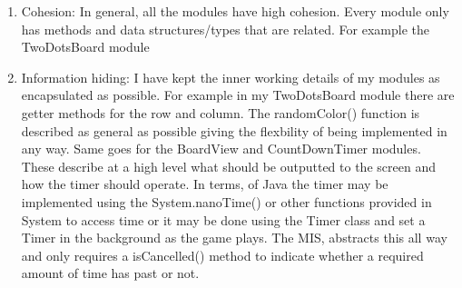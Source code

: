 \documentclass[12pt]{article}
\begin{document}
\begin{enumerate}
\item Cohesion: In general, all the modules have high cohesion. Every module only has methods and data structures/types that are related. For example the TwoDotsBoard module

\item Information hiding: I have kept the inner working details of my modules as encapsulated as possible. For example in my TwoDotsBoard module there are getter methods for the row and column. The randomColor() function is described as general as possible giving the flexbility of being implemented in any way. Same goes for the BoardView and CountDownTimer modules. These describe at a high level what should be outputted to the screen and how the timer should operate. In terms, of Java the timer may be implemented using the System.nanoTime() or other functions provided in System to access time or it may be done using the Timer class and set a Timer in the background as the game plays. The MIS, abstracts this all way and only requires a isCancelled() method to indicate whether a required amount of time has past or not.

\end{enumerate}
\end{document}
